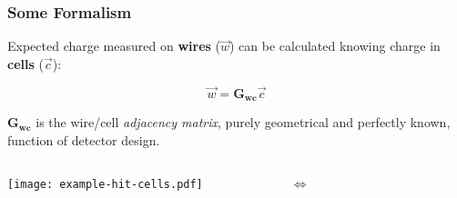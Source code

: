 \documentclass[xcolor=dvipsnames]{beamer}
\begin{document}
\begin{frame}[fragile]
  \frametitle{Some Formalism}
  Expected charge measured on \textbf{wires} ($\vec{w}$) can be calculated
  knowing charge in \textbf{cells} ($\vec{c}$):

  \[\vec{w} = \mathbf{G_{wc}}\vec{c}\]

  $\mathbf{G_{wc}}$ is the wire/cell \textit{adjacency matrix}, purely
  geometrical and perfectly known, function of detector design.
  
  \begin{columns}
    \begin{column}{0.45\textwidth}
      \vspace{-5mm}

      \flushright \texttt{[image: example-hit-cells.pdf]}

    \end{column}
    \begin{column}{0.10\textwidth}
      $\Leftrightarrow$
    \end{column}
    \begin{column}{0.45\textwidth}

\end{column}
\end{columns}
\end{frame}
\end{document}
